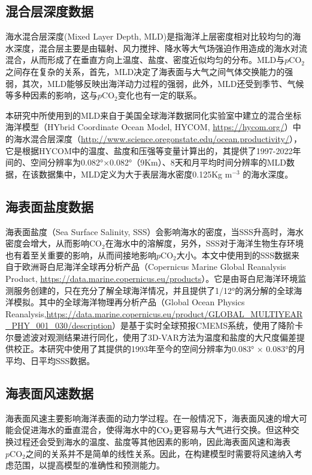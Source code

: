 \subsection{混合层深度数据}
海水混合层深度(Mixed Layer Depth, MLD)是指海洋上层密度相对比较均匀的海水深度，混合层主要是由辐射、风力搅拌、降水等大气场强迫作用造成的海水对流混合，从而形成了在垂直方向上温度、盐度、密度近似均匀的分布。MLD与$p\mathrm{CO_2}$之间存在复杂的关系，首先，MLD决定了海表面与大气之间气体交换能力的强弱，其次，MLD能够反映出海洋动力过程的强弱，此外，MLD还受到季节、气候等多种因素的影响，这与$p\mathrm{CO_2}$变化也有一定的联系。

本研究中所使用到的MLD来自于美国全球海洋数据同化实验室中建立的混合坐标海洋模型（HYbrid Coordinate Ocean Model, HYCOM, \url{https://hycom.org/}）中的海水混合层深度（\url{http://www.science.oregonstate.edu/ocean.productivity/}），它是根据HYCOM中的温度、盐度和压强等变量计算出的，其提供了1997-2022年间的、空间分辨率为0.082°×0.082°（9Km）、8天和月平均时间分辨率的MLD数据，在该数据集中，MLD定义为大于表层海水密度0.125Kg m$^{-3}$ 的海水深度。


\subsection{海表面盐度数据}
海表面盐度（Sea Surface Salinity, SSS）会影响海水的密度，当SSS升高时，海水密度会增大，从而影响$\mathrm{CO_2}$在海水中的溶解度，另外，SSS对于海洋生物生存环境也有着至关重要的影响，从而间接地影响$p\mathrm{CO_2}$大小。本文中使用到的SSS数据来自于欧洲哥白尼海洋全球再分析产品（Copernicus Marine Global Reanalysis Product, \url{https://data.marine.copernicus.eu/products}）。它是由哥白尼海洋环境监测服务创建的，只在充分了解全球海洋情况，并且提供了1/12°的涡分解的全球海洋模拟。其中的全球海洋物理再分析产品（Global Ocean Physics Reanalysis,\url{https://data.marine.copernicus.eu/product/GLOBAL\_MULTIYEAR\_PHY\_001\_030/description}）是基于实时全球预报CMEMS系统，使用了降阶卡尔曼滤波对观测结果进行同化，使用了3D-VAR方法为温度和盐度的大尺度偏差提供校正。本研究中使用了其提供的1993年至今的空间分辨率为0.083° × 0.083°的月平均、日平均SSS数据。


\subsection{海表面风速数据}
海表面风速主要影响海洋表面的动力学过程。在一般情况下，海表面风速的增大可能会促进海水的垂直混合，使得海水中的$\rm CO_2$更容易与大气进行交换。但这种交换过程还会受到海水的温度、盐度等其他因素的影响，因此海表面风速和海表$p\mathrm{CO_2}$之间的关系并不是简单的线性关系。因此，在构建模型时需要将风速纳入考虑范围，以提高模型的准确性和预测能力。

